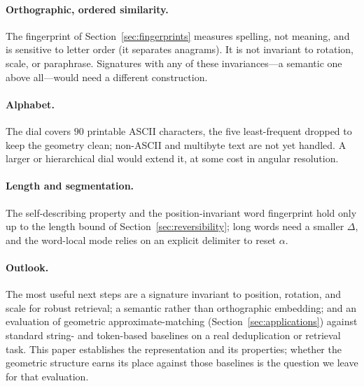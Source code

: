 \documentclass[11pt]{article}
\begin{document}
\paragraph{Orthographic, ordered similarity.} The fingerprint of
Section~\ref{sec:fingerprints} measures spelling, not meaning, and is sensitive to letter
order (it separates anagrams). It is not invariant to rotation, scale, or paraphrase.
Signatures with any of these invariances---a semantic one above all---would need a different
construction.

\paragraph{Alphabet.} The dial covers $90$ printable ASCII characters, the five least-frequent
dropped to keep the geometry clean; non-ASCII and multibyte text are not yet handled. A larger
or hierarchical dial would extend it, at some cost in angular resolution.

\paragraph{Length and segmentation.} The self-describing property and the position-invariant
word fingerprint hold only up to the length bound of Section~\ref{sec:reversibility}; long
words need a smaller $\Delta$, and the word-local mode relies on an explicit delimiter to reset
$\alpha$.

\paragraph{Outlook.} The most useful next steps are a signature invariant to position,
rotation, and scale for robust retrieval; a semantic rather than orthographic embedding; and an
evaluation of geometric approximate-matching (Section~\ref{sec:applications}) against standard
string- and token-based baselines on a real deduplication or retrieval task. This paper
establishes the representation and its properties; whether the geometric structure earns its
place against those baselines is the question we leave for that evaluation.
\end{document}
